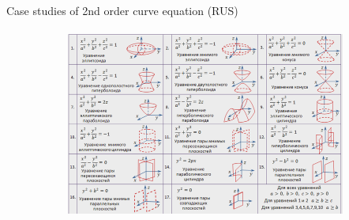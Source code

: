 \documentclass[aspectratio=169]{beamer}
\begin{document}
\begin{frame}[t]{Case studies of 2nd order curve equation (RUS)}
    \framesubtitle{}
        \vspace{-0.6cm}
        \begin{figure}[H]
            \centering\includegraphics[height=6cm,width=1\textwidth,keepaspectratio]{curve_eq_rus.png}
            \label{fig:curve_eq_rus.png}
        \end{figure}
    \end{frame}
\end{document}
